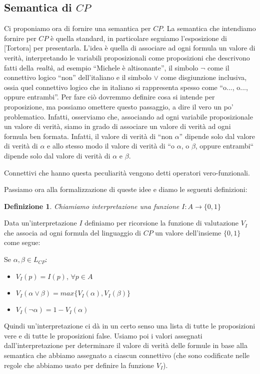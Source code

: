 \documentclass[a4paper, 12pt]{article}
\newtheorem{definition}{Definizione}
\begin{document}
\subsection{Semantica di $CP$}
Ci proponiamo ora di fornire una semantica per $CP$.
La semantica che intendiamo fornire per $CP$ è quella standard, in particolare
seguiamo l'esposizione di [Tortora] per presentarla.
L'idea è quella di associare ad ogni formula
un valore di verità, interpretando le variabili proposizionali come proposizioni
che descrivono fatti della \textit{realtà}, ad esempio ``Michele è altisonante'',
il simbolo $\neg$ come il connettivo logico ``non'' dell'italiano
e il simbolo $\lor$ come disgiunzione inclusiva, ossia quel connettivo
logico che in italiano si rappresenta spesso come ``o..., o..., oppure entrambi''.
Per fare ciò dovremmo definire cosa si intende per proposizione,
ma possiamo omettere questo passaggio, a dire il vero un po' problematico.
Infatti, osserviamo che, associando ad ogni variabile proposizionale un valore di verità,
siamo in grado di associare un valore di verità ad ogni formula ben formata.
Infatti, il valore di verità di ``non $\alpha$'' dipende solo dal valore di verità
di $\alpha$ e allo stesso modo il valore di verità di
``o $\alpha$, o $\beta$, oppure entrambi``
dipende solo dal valore di verità di $\alpha$ e $\beta$.

Connettivi che hanno questa peculiarità vengono detti operatori vero-funzionali.

Passiamo ora alla formalizzazione di queste idee e diamo le seguenti definizioni:

\begin{definition}
Chiamiamo interpretazione una funzione $I: A \to \{0, 1\}$
\end{definition}

Data un'interpretazione $I$ definiamo per ricorsione la funzione di valutazione $V_I$ che associa ad ogni formula
del linguaggio di $CP$ un valore dell'insieme $\{0, 1\}$ come segue:

Se $\alpha, \beta \in L_{CP}$:
\begin{itemize}
\item $V_I(p) = I(p)$, $\forall p \in A$
\item $V_I(\alpha \lor \beta) = max\{V_I(\alpha), V_I(\beta)\}$
\item $V_I(\neg \alpha) = 1 - V_I(\alpha)$
\end{itemize}


Quindi un'interpretazione ci dà in un certo senso una lista di tutte le proposizioni
vere e di tutte le proposizioni false.
Usiamo poi i valori assegnati dall'interpretazione per determinare il valore di verità delle formule
in base alla semantica che abbiamo assegnato a ciascun connettivo (che sono codificate nelle regole
che abbiamo usato per definire la funzione $V_I$).
\end{document}
